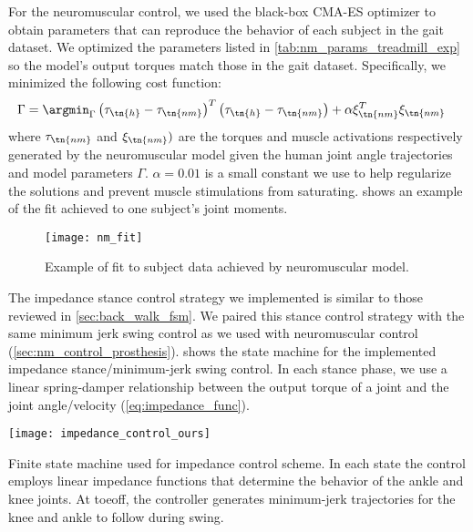 For the neuromuscular control, we used the black-box CMA-ES optimizer
\citep{hansen2006cma} to obtain parameters that can reproduce the behavior of
each subject in the gait dataset. We optimized the parameters listed in
\cref{tab:nm_params_treadmill_exp} so the model's output torques match those in
the gait dataset. Specifically, we minimized the following cost function:
\begin{align}
    \Gamma &= \argmin_\Gamma \left(\tau_\tn{h} - \tau_\tn{nm} \right)^T
    \left(\tau_\tn{h} - \tau_\tn{nm} \right) + \alpha \xi_\tn{nm}^T \xi_\tn{nm}
\end{align}
where $\tau_\tn{nm}$ and  $\xi_\tn{nm})$ are the torques and muscle activations
respectively generated by the neuromuscular model given the human joint angle
trajectories and model parameters $\Gamma$. $\alpha = 0.01$ is a small constant
we use to help regularize the solutions and prevent muscle stimulations from
saturating.  shows an example of the fit achieved to
one subject's joint moments.
\begin{figure}[b]
    \centering 
    \texttt{[image: nm\_fit]}
    \caption{Example of fit to subject data achieved by neuromuscular
    model.}\label{fig:treadmill_nm_fit}
\end{figure}

The impedance stance control strategy we implemented is similar to those
reviewed in \cref{sec:back_walk_fsm}. We paired this stance control strategy
with the same minimum jerk swing control as we used with neuromuscular control
(\cref{sec:nm_control_prosthesis}).  shows the
state machine for the implemented impedance stance/minimum-jerk swing control.
In each stance phase, we use a linear spring-damper relationship between the
output torque of a joint and the joint angle/velocity
(\cref{eq:impedance_func}).
\begin{marginfigure}
    \centering
    \texttt{[image: impedance\_control\_ours]}
    \caption[Finite state machine used for impedance control scheme]{Finite
    state machine used for impedance control scheme. In each state the control
    employs linear impedance functions that determine the behavior of the ankle
    and knee joints. At toeoff, the controller generates minimum-jerk
    trajectories for the knee and ankle to follow during
    swing.}\label{fig:impedance_control_ours}
\end{marginfigure}

